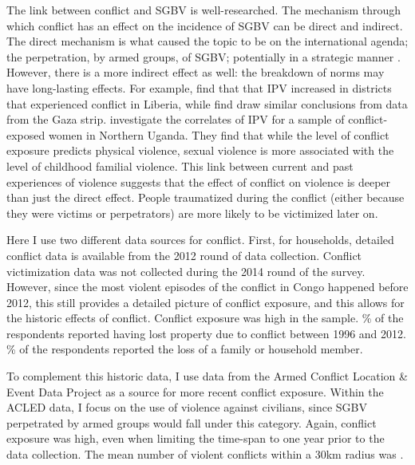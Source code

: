 \documentclass[11pt,a4paper]{scrartcl} %
\begin{document}
The link between conflict and SGBV is well-researched. The mechanism through which conflict has an effect on the incidence of SGBV can be direct and indirect. The direct mechanism is what caused the topic to be on the international agenda; the perpetration, by armed groups, of SGBV; potentially in a strategic manner \citep{Baaz2013,Kirby2015}. However, there is a more indirect effect as well: the breakdown of norms may have long-lasting effects. For example,\cite{Kelly2018} find that that IPV increased in districts that experienced conflict in Liberia, while \cite{Muller2019} find draw similar conclusions from data from the Gaza strip. \cite{Saile2013} investigate the correlates of IPV for a sample of conflict-exposed women in Northern Uganda. They find that while the level of conflict exposure predicts physical violence, sexual violence is more associated with the level of childhood familial violence. This link between current and past experiences of violence suggests that the effect of conflict on violence is deeper than just the direct effect. People traumatized during the conflict (either because they were victims or perpetrators) are more likely to be victimized later on. 

Here I use two different data sources for conflict. First, for  households, detailed conflict data is available from the 2012 round of data collection. Conflict victimization data was not collected during the 2014 round of the survey. However, since the most violent episodes of the conflict in Congo happened before 2012, this still provides a detailed picture of conflict exposure, and this allows for the historic effects of conflict. Conflict exposure was high in the sample. \% of the respondents reported having lost property due to conflict between 1996 and 2012.  \% of the respondents reported the loss of a family or household member.

To complement this historic data, I use data from the Armed Conflict Location \& Event Data Project \citep[ACLED;][]{Raleigh2010} as a source for more recent conflict exposure. Within the ACLED data, I focus on the use of violence against civilians, since SGBV perpetrated by armed groups would fall under this category. Again, conflict exposure was high, even when limiting the time-span to one year prior to the data collection. The mean number of violent conflicts within a 30km radius was .
\end{document}
